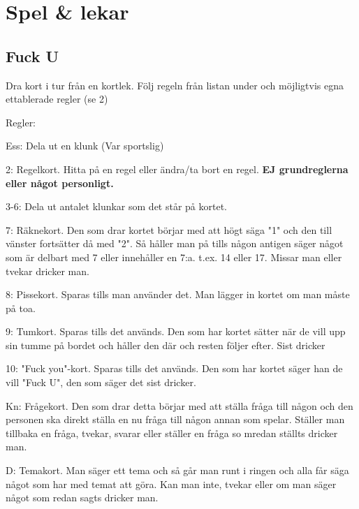 
\section{Spel \& lekar}

\pagestyle{Spel & lekar}



\subsection*{\textbf{Fuck U}}


Dra kort i tur från en kortlek. Följ regeln från listan under
och möjligtvis egna ettablerade regler (se 2)

Regler:

Ess: Dela ut en klunk (Var sportslig)

2: Regelkort. Hitta på en regel eller ändra/ta bort en regel. \textbf{EJ grundreglerna eller något personligt.}

3-6: Dela ut antalet klunkar som det står på kortet.

7: Räknekort. Den som drar kortet börjar med att högt säga "1"
och den till vänster fortsätter då med "2".
Så håller man på tills någon antigen säger något som är
delbart med 7 eller innehåller en 7:a. t.ex. 14 eller 17.
Missar man eller tvekar dricker man.

8: Pissekort. Sparas tills man använder det. Man lägger in kortet om man måste på toa.

9: Tumkort. Sparas tills det används.
Den som har kortet sätter när de vill upp sin tumme på bordet
och håller den där och resten följer efter.
Sist dricker

10: "Fuck you"-kort.
Sparas tills det används. Den som har kortet säger han de vill "Fuck U", den som säger det sist dricker.

Kn: Frågekort. Den som drar detta börjar med att ställa fråga till någon
och den personen ska direkt ställa en nu fråga till någon
annan som spelar. Ställer man tillbaka en fråga, tvekar, svarar
eller ställer en fråga so mredan ställts dricker man.

D: Temakort. Man säger ett tema och så går man runt i
ringen och alla får säga något som har med temat att göra.
Kan man inte, tvekar eller om man säger något som redan sagts dricker man.

